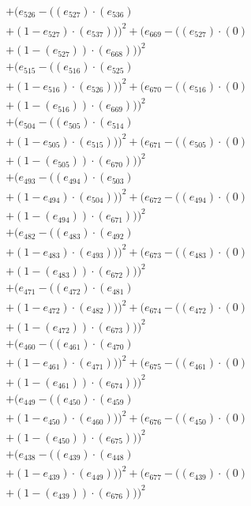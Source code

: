 \documentclass[10pt, a4paper]{article}
\begin{document}
\begin{align*}
& + (e_{526} - ((e_{527})  \cdot  (e_{536}) \\
& + (1 - e_{527})  \cdot  (e_{537})))^{2} + (e_{669} - ((e_{527}) \cdot (0) \\
& + (1 - (e_{527})) \cdot (e_{668})))^{2} \\
& + (e_{515} - ((e_{516})  \cdot  (e_{525}) \\
& + (1 - e_{516})  \cdot  (e_{526})))^{2} + (e_{670} - ((e_{516}) \cdot (0) \\
& + (1 - (e_{516})) \cdot (e_{669})))^{2} \\
& + (e_{504} - ((e_{505})  \cdot  (e_{514}) \\
& + (1 - e_{505})  \cdot  (e_{515})))^{2} + (e_{671} - ((e_{505}) \cdot (0) \\
& + (1 - (e_{505})) \cdot (e_{670})))^{2} \\
& + (e_{493} - ((e_{494})  \cdot  (e_{503}) \\
& + (1 - e_{494})  \cdot  (e_{504})))^{2} + (e_{672} - ((e_{494}) \cdot (0) \\
& + (1 - (e_{494})) \cdot (e_{671})))^{2} \\
& + (e_{482} - ((e_{483})  \cdot  (e_{492}) \\
& + (1 - e_{483})  \cdot  (e_{493})))^{2} + (e_{673} - ((e_{483}) \cdot (0) \\
& + (1 - (e_{483})) \cdot (e_{672})))^{2} \\
& + (e_{471} - ((e_{472})  \cdot  (e_{481}) \\
& + (1 - e_{472})  \cdot  (e_{482})))^{2} + (e_{674} - ((e_{472}) \cdot (0) \\
& + (1 - (e_{472})) \cdot (e_{673})))^{2} \\
& + (e_{460} - ((e_{461})  \cdot  (e_{470}) \\
& + (1 - e_{461})  \cdot  (e_{471})))^{2} + (e_{675} - ((e_{461}) \cdot (0) \\
& + (1 - (e_{461})) \cdot (e_{674})))^{2} \\
& + (e_{449} - ((e_{450})  \cdot  (e_{459}) \\
& + (1 - e_{450})  \cdot  (e_{460})))^{2} + (e_{676} - ((e_{450}) \cdot (0) \\
& + (1 - (e_{450})) \cdot (e_{675})))^{2} \\
& + (e_{438} - ((e_{439})  \cdot  (e_{448}) \\
& + (1 - e_{439})  \cdot  (e_{449})))^{2} + (e_{677} - ((e_{439}) \cdot (0) \\
& + (1 - (e_{439})) \cdot (e_{676})))^{2} \\

\end{align*}
\end{document}
